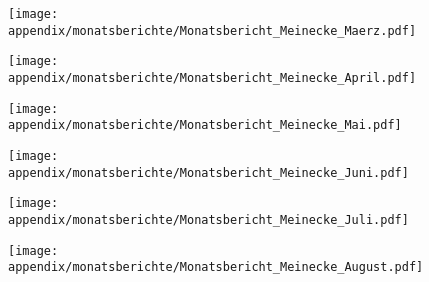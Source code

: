\addtocounter{anhang}{1}

\begin{figure}[htbp]

\texttt{[image: appendix/monatsberichte/Monatsbericht\_Meinecke\_Maerz.pdf]}

\end{figure}


\begin{figure}[htbp]
  \texttt{[image: appendix/monatsberichte/Monatsbericht\_Meinecke\_April.pdf]}
\end{figure}
\begin{figure}[htbp]
%
  \texttt{[image: appendix/monatsberichte/Monatsbericht\_Meinecke\_Mai.pdf]}
\end{figure}
\begin{figure}[htbp]
%
 \texttt{[image: appendix/monatsberichte/Monatsbericht\_Meinecke\_Juni.pdf]}
\end{figure}
\begin{figure}[htbp]
%
  \texttt{[image: appendix/monatsberichte/Monatsbericht\_Meinecke\_Juli.pdf]}
\end{figure}
\begin{figure}[htbp]
%
  \texttt{[image: appendix/monatsberichte/Monatsbericht\_Meinecke\_August.pdf]}
\end{figure}

